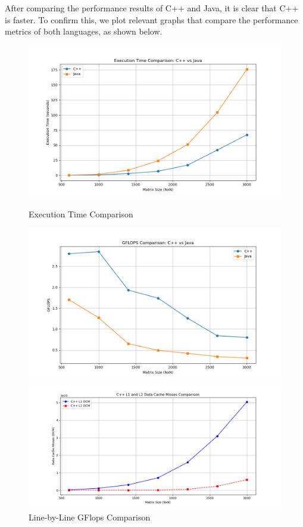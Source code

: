 \documentclass{article}
\begin{document}
After comparing the performance results of C++ and Java, it is clear that C++ is faster. To confirm this, we plot relevant graphs that compare the performance metrics of both languages, as shown below.

\begin{figure}[H]
    \centering
    \begin{minipage}{0.32\textwidth}
        \centering
        \includegraphics[width=\textwidth]{Figure_1.png}
        \caption{\small Execution Time Comparison}
        \label{fig:execution_time}
    \end{minipage}
    \hfill
    \begin{minipage}{0.32\textwidth}
        \centering
        \includegraphics[width=\textwidth]{Figure_2.png}
        \caption{\small Line-by-Line GFlops Comparison}
        \label{fig:flops}
    \end{minipage}
    \hfill
    \begin{minipage}{0.32\textwidth}
        \centering
        \includegraphics[width=\textwidth]{Figure_3.png}

\end{minipage}
\end{figure}
\end{document}
